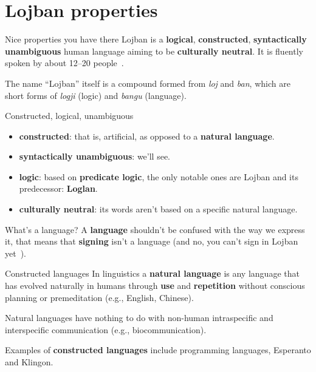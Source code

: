 \section{Lojban properties}
\begin{frame}{Nice properties you have there}
    Lojban is a \textbf{logical}, \textbf{constructed}, \textbf{syntactically unambiguous} human language aiming to be \textbf{culturally neutral}. It is fluently spoken by about 12--20 people~\cite{lojban:speakers}.

    \pause
    The name ``Lojban'' itself is a compound formed from \emph{loj} and \emph{ban}, which are short forms of \emph{logji} (logic) and \emph{bangu} (language).
\end{frame}

\begin{frame}{Constructed, logical, unambiguous}
    \begin{itemize}
        \item \textbf{constructed}: that is, artificial, as opposed to a \textbf{natural language}.
        \item \textbf{syntactically unambiguous}: we'll see.
        \item \textbf{logic}: based on \textbf{predicate logic}, the only notable ones are Lojban and its predecessor: \textbf{Loglan}.
        \item \textbf{culturally neutral}: its words aren't based on a specific natural language.
    \end{itemize}
\end{frame}

\begin{frame}{What's a language?}
    A \textbf{language} shouldn't be confused with the way we express it, that means that \textbf{signing} isn't a language (and no, you can't sign in Lojban yet~\cite{lojban:signing}).
\end{frame}

\begin{frame}{Constructed languages}
    In linguistics a \textbf{natural language} is any language that has evolved naturally in humans through \textbf{use} and \textbf{repetition} without conscious planning or premeditation (e.g., English, Chinese).

    Natural languages have nothing to do with non-human intraspecific and interspecific communication (e.g., biocommunication).

    Examples of \textbf{constructed languages} include programming languages, Esperanto and Klingon.
\end{frame}

